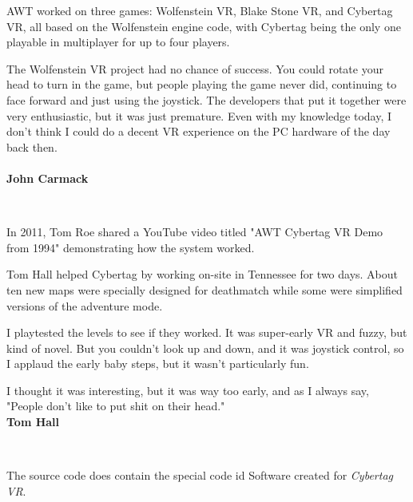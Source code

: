  AWT worked on three games: Wolfenstein VR, Blake Stone VR, and Cybertag VR, all based on the Wolfenstein engine code, with Cybertag being the only one playable in multiplayer for up to four players. \\
\par
\begin{fancyquotes}
The Wolfenstein VR project had no chance of success.  You could rotate your head to turn in the game, but people playing the game never did, continuing to face forward and just using the joystick.  The developers that put it together were very enthusiastic, but it was just premature.  Even with my knowledge today, I don't think I could do a decent VR experience on the PC hardware of the day back then.\\
\bigskip \\
\textbf{John Carmack}
 \end{fancyquotes}\\
\par
\vspace{-5pt}
In 2011, Tom Roe shared a YouTube video titled "AWT Cybertag VR Demo from 1994" demonstrating how the system worked. 


\begin{figure}[H]
  \centering
 
\end{figure}

\begin{figure}[H]
  \centering
{}
\end{figure}

\begin{figure}[H]
  \centering
{}
\end{figure}

\begin{figure}[H]
  \centering
{}
 
\end{figure}
\par
Tom Hall helped Cybertag by working on-site in Tennessee for two days. About ten new maps were specially designed for deathmatch while some were simplified versions of the adventure mode.\\
\par
\begin{fancyquotes}
I playtested the levels to see if they worked. It was super-early VR and fuzzy, but kind of novel. But you couldn't look up and down, and it was joystick control, so I applaud the early baby steps, but it wasn't particularly fun.\\
\par

I thought it was interesting, but it was way too early, and as I always say, "People don't like to put shit on their head."
\bigskip \\
\textbf{Tom Hall}
 \end{fancyquotes}\\
\par
The source code does contain the special code id Software created for \textit{Cybertag VR}.\\
\par
{}

